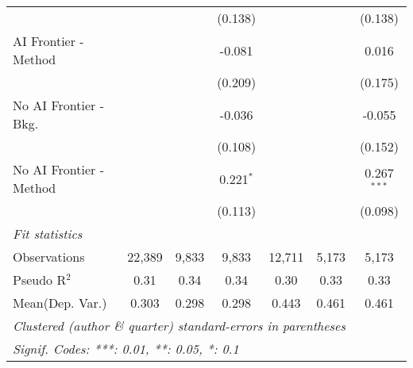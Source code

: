 \begin{tabular}{lcccccc}
                           &               &               & (0.138)       &               &               & (0.138)\\   
   AI Frontier - Method    &               &               & -0.081        &               &               & 0.016\\   
                           &               &               & (0.209)       &               &               & (0.175)\\   
   No AI Frontier - Bkg.   &               &               & -0.036        &               &               & -0.055\\   
                           &               &               & (0.108)       &               &               & (0.152)\\   
   No AI Frontier - Method &               &               & 0.221$^{*}$   &               &               & 0.267$^{***}$\\   
                           &               &               & (0.113)       &               &               & (0.098)\\   
   \midrule
   \emph{Fit statistics}\\
   Observations            & 22,389        & 9,833         & 9,833         & 12,711        & 5,173         & 5,173\\  
   Pseudo R$^2$            & 0.31          & 0.34          & 0.34          & 0.30          & 0.33          & 0.33\\  
Mean(Dep. Var.) & 0.303 & 0.298 & 0.298 & 0.443 & 0.461 & 0.461 \\
   \midrule \midrule
   \multicolumn{7}{l}{\emph{Clustered (author \& quarter) standard-errors in parentheses}}\\
   \multicolumn{7}{l}{\emph{Signif. Codes: ***: 0.01, **: 0.05, *: 0.1}}\\
\end{tabular}
\par\endgroup
